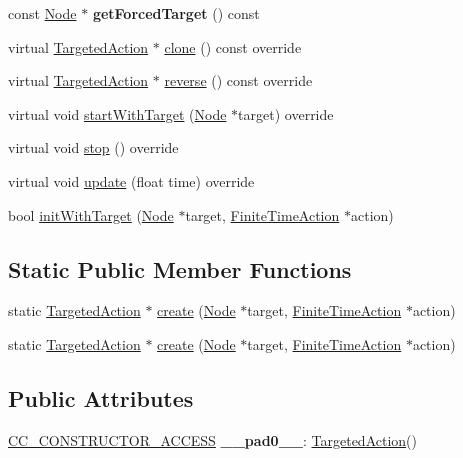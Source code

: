 \begin{DoxyCompactItemize}
const \hyperlink{classNode}{Node} $\ast$ {\bfseries get\+Forced\+Target} () const
\item 
virtual \hyperlink{classTargetedAction}{Targeted\+Action} $\ast$ \hyperlink{classTargetedAction_a656924ba4addd3f5599c5c1c4032578d}{clone} () const override
\item 
virtual \hyperlink{classTargetedAction}{Targeted\+Action} $\ast$ \hyperlink{classTargetedAction_aba40e6b10ed5123d26a3adc05933c561}{reverse} () const override
\item 
virtual void \hyperlink{classTargetedAction_a7fe60b527a5f01a0bf36e7fc41157d11}{start\+With\+Target} (\hyperlink{classNode}{Node} $\ast$target) override
\item 
virtual void \hyperlink{classTargetedAction_a006f4ba95607369684770186588d12ce}{stop} () override
\item 
virtual void \hyperlink{classTargetedAction_a95ad5a7c4384449e147f0200d1c4b84b}{update} (float time) override
\item 
bool \hyperlink{classTargetedAction_ab1de67f9331ac62396a6c22f7c7a6b67}{init\+With\+Target} (\hyperlink{classNode}{Node} $\ast$target, \hyperlink{classFiniteTimeAction}{Finite\+Time\+Action} $\ast$action)
\end{DoxyCompactItemize}
\subsection*{Static Public Member Functions}
\begin{DoxyCompactItemize}
\item 
static \hyperlink{classTargetedAction}{Targeted\+Action} $\ast$ \hyperlink{classTargetedAction_ad30cd1e7fcba3c18914be8bf6e71ac28}{create} (\hyperlink{classNode}{Node} $\ast$target, \hyperlink{classFiniteTimeAction}{Finite\+Time\+Action} $\ast$action)
\item 
static \hyperlink{classTargetedAction}{Targeted\+Action} $\ast$ \hyperlink{classTargetedAction_a1f2636cb594d4a90eedf5e13f1f6b6db}{create} (\hyperlink{classNode}{Node} $\ast$target, \hyperlink{classFiniteTimeAction}{Finite\+Time\+Action} $\ast$action)
\end{DoxyCompactItemize}
\subsection*{Public Attributes}
\begin{DoxyCompactItemize}
\item 
\mbox{\label{classTargetedAction_acafe19e6676f253ea55120a833ed5b4b}} 
\hyperlink{_2cocos2d_2cocos_2base_2ccConfig_8h_a25ef1314f97c35a2ed3d029b0ead6da0}{C\+C\+\_\+\+C\+O\+N\+S\+T\+R\+U\+C\+T\+O\+R\+\_\+\+A\+C\+C\+E\+SS} {\bfseries \+\_\+\+\_\+pad0\+\_\+\+\_\+}\+: \hyperlink{classTargetedAction}{Targeted\+Action}()
\end{DoxyCompactItemize}
